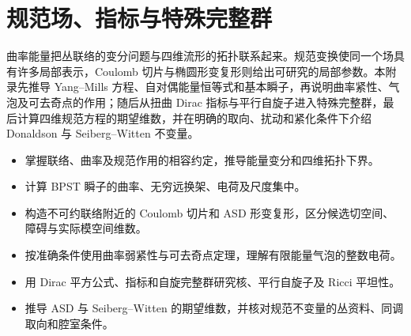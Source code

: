 
% 
% 
% 
% 
% 
% 
% 
% 
% 

\chapter{规范场、指标与特殊完整群}
\label{g3:app:B}

\begin{chapterabstract}
 曲率能量把丛联络的变分问题与四维流形的拓扑联系起来。规范变换使同一个场具有许多局部表示，Coulomb 切片与椭圆形变复形则给出可研究的局部参数。本附录先推导 Yang--Mills 方程、自对偶能量恒等式和基本瞬子，再说明曲率紧性、气泡及可去奇点的作用；随后从扭曲 Dirac 指标与平行自旋子进入特殊完整群，最后计算四维规范方程的期望维数，并在明确的取向、扰动和紧化条件下介绍 Donaldson 与 Seiberg--Witten 不变量。
\end{chapterabstract}

\begin{learninggoals}
 \begin{itemize}
  \item 掌握联络、曲率及规范作用的相容约定，推导能量变分和四维拓扑下界。
  \item 计算 BPST 瞬子的曲率、无穷远换架、电荷及尺度集中。
  \item 构造不可约联络附近的 Coulomb 切片和 ASD 形变复形，区分候选切空间、障碍与实际模空间维数。
  \item 按准确条件使用曲率弱紧性与可去奇点定理，理解有限能量气泡的整数电荷。
  \item 用 Dirac 平方公式、指标和自旋完整群研究核、平行自旋子及 Ricci 平坦性。
  \item 推导 ASD 与 Seiberg--Witten 的期望维数，并核对规范不变量的丛资料、同调取向和腔室条件。
 \end{itemize}
\end{learninggoals}

